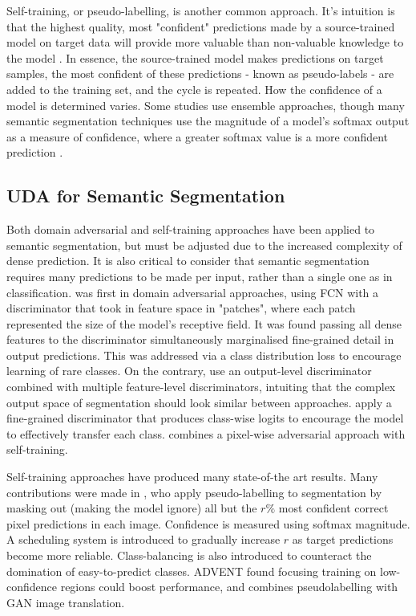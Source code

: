 \documentclass[a4paper,12pt]{report}
\begin{document}
Self-training, or pseudo-labelling, is another common approach. It's intuition is that the highest quality, most "confident" predictions made by a source-trained model on target data will provide more valuable than non-valuable knowledge to the model \cite{wilson_survey_2020} \cite{kamnitsas_transductive_2021}. In essence, the source-trained model makes predictions on target samples, the most confident of these predictions - known as pseudo-labels - are added to the training set, and the cycle is repeated. How the confidence of a model is determined varies. Some studies use ensemble approaches, though many semantic segmentation techniques use the magnitude of a model's softmax output as a measure of confidence, where a greater softmax value is a more confident prediction \cite{zou_domain_2018}.


\subsection*{UDA for Semantic Segmentation}

Both domain adversarial and self-training approaches have been applied to semantic segmentation, but must be adjusted due to the increased complexity of dense prediction. It is also critical to consider that semantic segmentation requires many predictions to be made per input, rather than a single one as in classification. \cite{hoffman_fcns_2016} was first in domain adversarial approaches, using FCN with a discriminator that took in feature space in "patches", where each patch represented the size of the model's receptive field. It was found passing all dense features to the discriminator simultaneously marginalised fine-grained detail in output predictions. This was addressed via a class distribution loss to encourage learning of rare classes. On the contrary, \cite{tsai_learning_2020} use an output-level discriminator combined with multiple feature-level discriminators, intuiting that the complex output space of segmentation should look similar between approaches. \cite{wang_classes_2020} apply a fine-grained discriminator that produces class-wise logits to encourage the model to effectively transfer each class. \cite{michieli_adversarial_2020} combines a pixel-wise adversarial approach with self-training.

Self-training approaches have produced many state-of-the art results. Many contributions were made in \cite{zou_domain_2018}, who apply pseudo-labelling to segmentation by masking out (making the model ignore) all but the $r\%$ most confident correct pixel predictions in each image. Confidence is measured using softmax magnitude. A scheduling system is introduced to gradually increase $r$ as target predictions become more reliable. Class-balancing is also introduced to counteract the domination of easy-to-predict classes. ADVENT \cite{vu_advent_2019} found focusing training on low-confidence regions could boost performance, and \cite{li_bidirectional_2019} combines pseudolabelling with GAN image translation.
\end{document}
